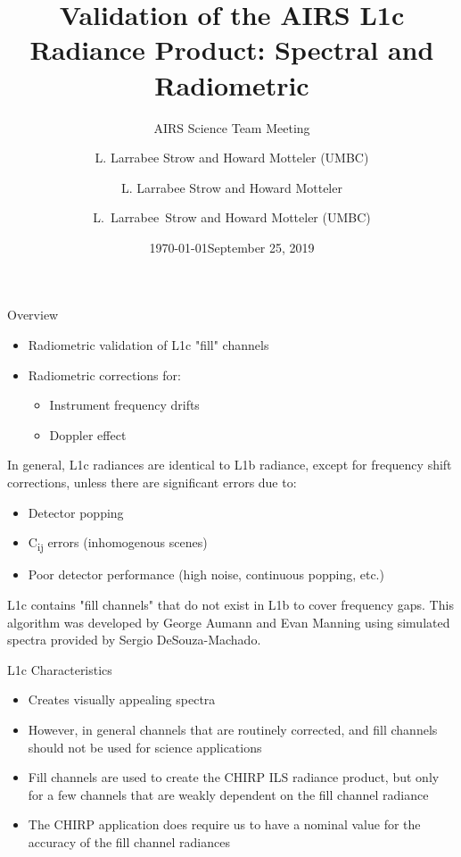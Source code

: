 \documentclass[10pt,t]{beamer}
\author{L. Larrabee Strow and Howard Motteler (UMBC)}
\date{\today}
\title{\large Validation of the AIRS L1c Radiance Product: Spectral and Radiometric}
\subtitle{\footnotesize{AIRS Science Team Meeting}}
\date{\vspace{0.1in}\footnotesize{September 25, 2019\vfill}}
\author{L. Larrabee Strow\inst{1,2} and Howard Motteler\inst{2}}
\institute[UMBC]{\inst{1} UMBC Physics Dept. \and \inst{2}UMBC JCET}
\author{L.~Larrabee~Strow and Howard Motteler (UMBC)}
\begin{document}
\maketitle
{}

\begin{frame}[label={sec:orgb6b6e7f}]{Overview}
\begin{itemize}
\item Radiometric validation of L1c "fill" channels
\item Radiometric corrections for:
\begin{itemize}
\item Instrument frequency drifts
\item Doppler effect
\end{itemize}
\end{itemize}

In general, L1c radiances are identical to L1b radiance, except for frequency shift corrections, unless there are significant errors due to:
\begin{itemize}
\item Detector popping
\item C\textsubscript{ij} errors (inhomogenous scenes)
\item Poor detector performance (high noise, continuous popping, etc.)
\end{itemize}

L1c contains "fill channels" that do not exist in L1b to cover frequency gaps.   This algorithm was developed by George Aumann and Evan Manning using simulated spectra provided by Sergio DeSouza-Machado.
\end{frame}

\begin{frame}[label={sec:orga5ec514}]{L1c Characteristics}
\begin{itemize}
\item Creates visually appealing spectra
\item However, in general channels that are routinely corrected, and fill channels should not be used for science applications
\item Fill channels are used to create the CHIRP ILS radiance product, but only for a few channels that are weakly dependent on the fill channel radiance
\item The CHIRP application does require us to have a nominal value for the accuracy of the fill channel radiances
\end{itemize}
\end{frame}
\end{document}

